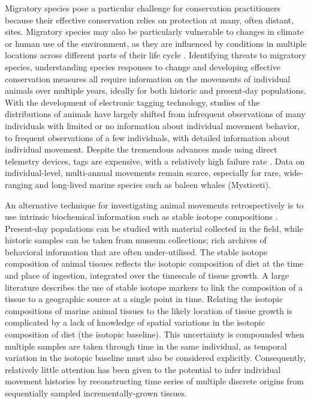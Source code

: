 \documentclass[a4paper,12pt]{article}
\begin{document}
Migratory species pose a particular challenge for conservation practitioners because their effective conservation relies on protection at many, often distant, sites\cite{runge2014conserving}. 
Migratory species may also be particularly vulnerable to changes in climate or human use of the environment, as they are influenced by conditions in multiple locations across different parts of their life cycle \cite{robinson2009travelling}. 
Identifying threats to migratory species, understanding species responses to change and developing effective conservation measures all require information on the movements of individual animals over multiple years, ideally for both historic and present-day populations. 
With the development of electronic tagging technology, studies of the distributions of animals have largely shifted from infrequent observations of many individuals with limited or no information about individual movement behavior, to frequent observations of a few individuals, with detailed information about individual movement\cite{holdo2013inferring}. 
Despite the tremendous advances made using direct telemetry devices, tags are expensive, with a relatively high failure rate \cite{bailey2009behavioural,best2015tag,mate2007evolution}. 
Data on individual-level, multi-annual movements remain scarce, especially for rare, wide-ranging and long-lived marine species such as baleen whales (Mysticeti)\cite{ryan2013stable,hall2005stable,bailey2009behavioural}.

An alternative technique for investigating animal movements retrospectively is to use intrinsic biochemical information such as stable isotope compositions \cite{west2006stable,busquets2017estimating,hobson2008tracking}. 
Present-day populations can be studied with material collected in the field, while historic samples can be taken from museum collections; rich archives of behavioral information that are often under-utilised\cite{lister2011natural}. 
The stable isotope composition of animal tissues reflects the isotopic composition of diet at the time and place of ingestion, integrated over the timescale of tissue growth. 
A large literature describes the use of stable isotope markers to link the composition of a tissue to a geographic source at a single point in time\cite{hobson2008tracking}. 
Relating the isotopic compositions of marine animal tissues to the likely location of tissue growth is complicated by a lack of knowledge of spatial variations in the isotopic composition of diet (the isotopic baseline)\cite{west2006stable,mcmahon2015millennial}. 
This uncertainty is compounded when multiple samples are taken through time in the same individual, as temporal variation in the isotopic baseline must also be considered explicitly. 
Consequently, relatively little attention has been given to the potential to infer individual movement histories by reconstructing time series of multiple discrete origins from sequentially sampled incrementally-grown tissues.
\end{document}
